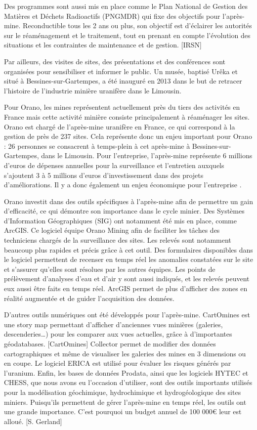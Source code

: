 \documentclass{article}
\begin{document}
Des programmes sont aussi mis en place comme le Plan National de Gestion des Matières et Déchets Radioactifs (PNGMDR) qui fixe des objectifs pour l’après-mine. Reconductible tous les 2 ans ou plus, son objectif est d’éclairer les autorités sur le réaménagement et le traitement, tout en prenant en compte l’évolution des situations et les contraintes de maintenance et de gestion.  [IRSN]

Par ailleurs, des visites de sites, des présentations et des conférences sont organisées pour sensibiliser et informer le public. Un musée, baptisé Urêka et situé à Bessines-sur-Gartempes, a été inauguré en 2013 dans le but de retracer l’histoire de l’industrie minière uranifère dans le Limousin.

Pour Orano, les mines représentent actuellement près du tiers des activités en France mais cette activité minière consiste principalement à réaménager les sites. Orano est chargé de l’après-mine uranifère en France, ce qui correspond à la gestion de près de 237 sites. Cela représente donc un enjeu important pour Orano : 26 personnes se consacrent à temps-plein à cet après-mine à Bessines-sur-Gartempes, dans le Limousin. Pour l’entreprise, l’après-mine représente 6 millions d’euros de dépenses annuelles pour la surveillance et l’entretien auxquels s’ajoutent 3 à 5 millions d’euros d’investissement dans des projets d’améliorations. Il y a donc également un enjeu économique pour l’entreprise \cite{himeur_apres-mine_2020}. 

Orano investit dans des outils spécifiques à l’après-mine afin de permettre un gain d’efficacité, ce qui démontre son importance dans le cycle minier. Des Systèmes d’Information Géographiques (SIG) ont notamment été mis en place, comme ArcGIS. Ce logiciel équipe Orano Mining afin de faciliter les tâches des techniciens chargés de la surveillance des sites. Les relevés sont notamment beaucoup plus rapides et précis grâce à cet outil. Des formulaires disponibles dans le logiciel permettent de recenser en temps réel les anomalies constatées sur le site et s’assurer qu’elles sont résolues par les autres équipes. Les points de prélèvement d’analyses d’eau et d’air y sont aussi indiqués, et les relevés peuvent eux aussi être faits en temps réel. ArcGIS permet de plus d’afficher des zones en réalité augmentée et de guider l’acquisition des données. 

D’autres outils numériques ont été développés pour l’après-mine. CartOmines est une story map permettant d’afficher d’anciennes vues minières (galeries, descenderies…) pour les comparer aux vues actuelles, grâce à d’importantes géodatabases. [CartOmines] Collector permet de modifier des données cartographiques et même de visualiser les galeries des mines en 3 dimensions ou en coupe. Le logiciel ERICA est utilisé pour évaluer les risques générés par l’uranium. Enfin, les bases de données Prodata, ainsi que les logiciels HYTEC et CHESS, que nous avons eu l’occasion d’utiliser, sont des outils importants utilisés pour la modélisation géochimique, hydrochimique et hydrogéologique des sites miniers. Puisqu’ils permettent de gérer l’après-mine en temps réel, les outils ont une grande importance. C’est pourquoi un budget annuel de 100 000€ leur est alloué. [S. Gerland]
\end{document}
